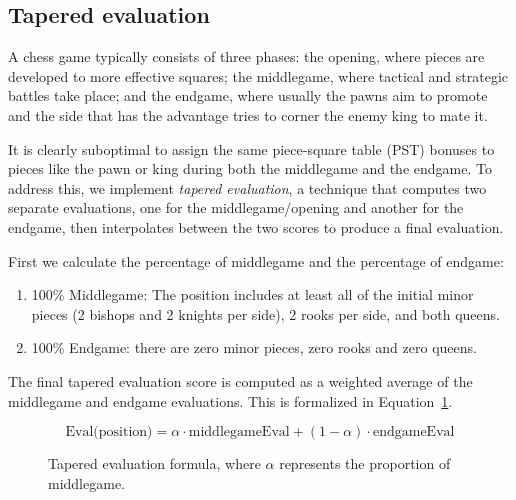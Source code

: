 \subsection*{Tapered evaluation}

\noindent A chess game typically consists of three phases: the opening, where pieces are developed to more effective squares; the middlegame, where tactical and strategic battles take place; and the endgame, where usually the pawns aim to promote and the side that has the advantage tries to corner the enemy king to mate it.

It is clearly suboptimal to assign the same piece-square table (PST) bonuses to pieces like the pawn or king during both the middlegame and the endgame. To address this, we implement \textit{tapered evaluation}, a technique that computes two separate evaluations, one for the middlegame/opening and another for the endgame, then interpolates between the two scores to produce a final evaluation.~\cite{TaperedEvaluation}

\vspace{1em}
\noindent First we calculate the percentage of middlegame and the percentage of endgame:

\begin{enumerate}
    \item 100\% Middlegame: The position includes at least all of the initial minor pieces (2 bishops and 2 knights per side), 2 rooks per side, and both queens.
    \item 100\% Endgame: there are zero minor pieces, zero rooks and zero queens.
\end{enumerate}
\vspace{1em}

\noindent The final tapered evaluation score is computed as a weighted average of the middlegame and endgame evaluations. This is formalized in Equation~\ref{fig:taperedEvalEquation}.

\begin{figure}[H]
    \centering
    \begin{minipage}{0.8\linewidth}
        \centering
        \begin{equation*}
            \text{Eval(position)} = \alpha \cdot \text{middlegameEval} + (1 - \alpha) \cdot \text{endgameEval}
        \end{equation*}
        \vspace{-1em}
    \end{minipage}
    \caption{Tapered evaluation formula, where $\alpha$ represents the proportion of middlegame.}
    \label{fig:taperedEvalEquation}
\end{figure}

